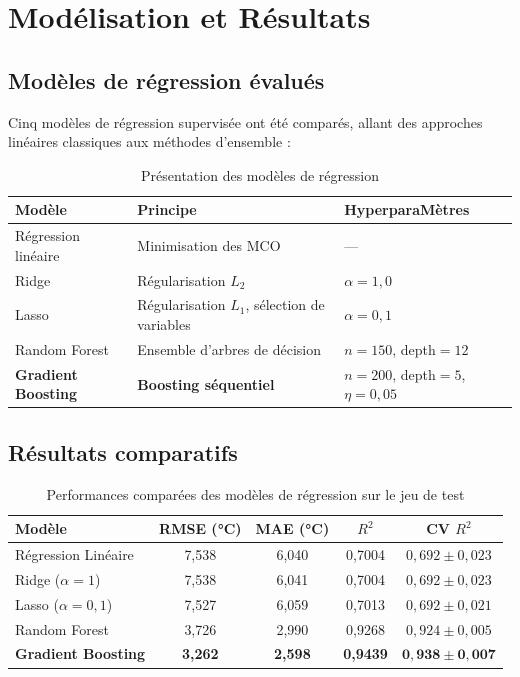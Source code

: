 \documentclass[a4paper,12pt]{report}
\begin{document}
\newpage
\chapter{Mod\'elisation et R\'esultats}

\section{Mod\`eles de r\'egression \'evalu\'es}

Cinq mod\`eles de r\'egression supervisée ont \'et\'e compar\'es, allant des approches lin\'eaires classiques aux m\'ethodes d'ensemble :

\begin{table}[H]
\centering
\caption{Pr\'esentation des mod\`eles de r\'egression}
\renewcommand{\arraystretch}{1.3}
\begin{tabular}{lll}
\toprule
\textbf{Mod\`ele} & \textbf{Principe} & \textbf{HyperparaM\`etres} \\
\midrule
R\'egression lin\'eaire & Minimisation des MCO & --- \\
Ridge & R\'egularisation $L_2$ & $\alpha = 1{,}0$ \\
Lasso & R\'egularisation $L_1$, s\'election de variables & $\alpha = 0{,}1$ \\
Random Forest & Ensemble d'arbres de d\'ecision & $n=150$, depth$=12$ \\
\textbf{Gradient Boosting} & \textbf{Boosting s\'equentiel} & $n=200$, depth$=5$, $\eta=0{,}05$ \\
\bottomrule
\end{tabular}
\end{table}

\section{R\'esultats comparatifs}

\begin{table}[H]
\centering
\caption{Performances compar\'ees des mod\`eles de r\'egression sur le jeu de test}
\renewcommand{\arraystretch}{1.4}
\begin{tabular}{lcccc}
\toprule
\textbf{Mod\`ele} & \textbf{RMSE (°C)} & \textbf{MAE (°C)} & \textbf{$R^2$} & \textbf{CV $R^2$} \\
\midrule
R\'egression Lin\'eaire & 7,538 & 6,040 & 0,7004 & $0{,}692 \pm 0{,}023$ \\
Ridge ($\alpha=1$) & 7,538 & 6,041 & 0,7004 & $0{,}692 \pm 0{,}023$ \\
Lasso ($\alpha=0{,}1$) & 7,527 & 6,059 & 0,7013 & $0{,}692 \pm 0{,}021$ \\
Random Forest & 3,726 & 2,990 & 0,9268 & $0{,}924 \pm 0{,}005$ \\
\rowcolor{ecamblue!15}
\textbf{Gradient Boosting} & \textbf{3,262} & \textbf{2,598} & \textbf{0,9439} & $\mathbf{0{,}938 \pm 0{,}007}$ \\
\bottomrule
\end{tabular}
\label{tab:resultats}
\end{table}
\end{document}
